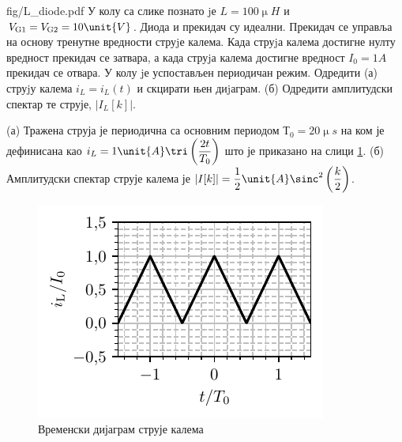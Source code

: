 \begin{slikaDesno}{fig/L_diode.pdf}
    \PID 
    У колу са слике познато jе $L = 100\unit{\upmu H}$ и 
    $V_{\rm G1} = V_{\rm G2} = 10\unit{V}$. Диода и
    прекидач су идеални. Прекидач се управља на основу тренутне вредности
    струjе калема. Када струjа калема достигне нулту вредност прекидач се
    затвара, а када струjа калема достигне вредност $I_0 = 1\unit{A}$ прекидач се
    отвара. У колу jе успостављен периодичан режим. 
    Одредити (а) струjу
    калема $i_L = i_L (t)$ и скцирати њен диjаграм. 
    (б) Одредити амплитудски спектар те струје, $|I_L [k]|$.    
\end{slikaDesno}

\REZULTAT 
(а) Тражена струја је периодична са основним периодом $Т_0 = 20\unit{\upmu s}$ на ком је дефинисана као 
$i_L = 1\unit{A} \tri\left(\dfrac{2t}{T_0}\right)$ што је приказано на слици \ref{fig:\ID.iL}. 
(б) Амплитудски спектар струје калема је 
$|I[k]| = \dfrac{1}{2}\unit{A} \sinc^2\left( \dfrac{k}{2} \right)$.

\begin{figure}
    \centering
    \includegraphics{fig/L_diode_iLL}
    \caption{Временски дијаграм струје калема}
    \label{fig:\ID.iL}
\end{figure}
